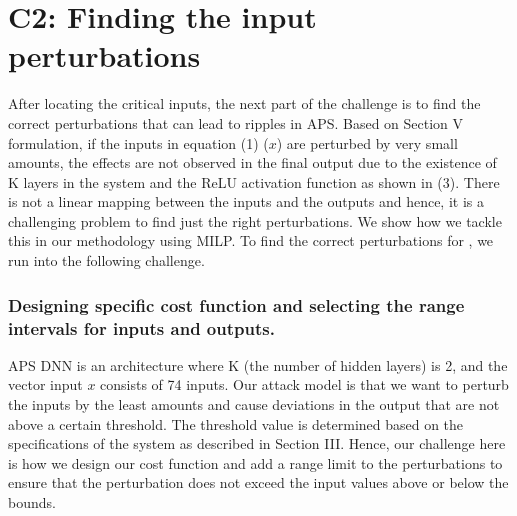 \section*{\textbf{C2}: Finding the input perturbations}
After locating the critical inputs, the next part of the challenge is to find the correct perturbations that can lead to ripples in APS. Based on Section V formulation, if the inputs in equation (1) ($x$) are perturbed by very small amounts, the effects are not observed in the final output due to the existence of K layers in the system and the ReLU activation function as shown in (3). There is not a linear mapping between the inputs and the outputs and hence, it is a challenging problem to find just the right perturbations. We show how we tackle this in our methodology using MILP. To find the correct perturbations for \attack, we run into the following challenge. 

\subsubsection*{Designing \attack specific cost function and selecting the range intervals for inputs and outputs. }
APS DNN is an architecture where K (the number of hidden layers) is 2, and the vector input $x$ consists of 74 inputs. Our attack model is that we want to perturb the inputs by the least amounts and cause deviations in the output that are not above a certain threshold. The threshold value is determined based on the specifications of the system as described in Section III. 
 Hence, our challenge here is how we design our cost function and add a range limit to the perturbations to ensure that the perturbation does not exceed the input values above or below the bounds. 

